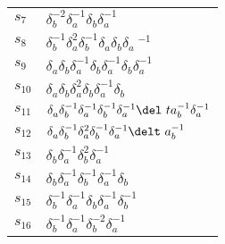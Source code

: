 \documentclass{article}
\begin{document}
\begin{center}
\begin{tabular}{ll}
$s_{7}$ & $\delta_b^{-2}\delta_a^{-1}\delta_b^{}\delta_a^{-1}$ \\
$s_{8}$ & $\delta_b^{-1}\delta_a^{2}\delta_b^{-1}\delta_a^{}\delta_b^{}\delta_a\
^{-1}$ \\
$s_{9}$ & $\delta_a^{}\delta_b^{}\delta_a^{-1}\delta_b^{}\delta_a^{-1}\delta_b^\
{}\delta_a^{-1}$ \\
$s_{10}$ & $\delta_a^{}\delta_b^{}\delta_a^{2}\delta_b^{}\delta_a^{-1}\delta_b^\
{}$ \\
$s_{11}$ & $\delta_a^{}\delta_b^{-1}\delta_a^{-1}\delta_b^{-1}\delta_a^{-1}\del\
ta_b^{-1}\delta_a^{-1}$ \\
$s_{12}$ & $\delta_a^{}\delta_b^{-1}\delta_a^{2}\delta_b^{-1}\delta_a^{-1}\delt\
a_b^{-1}$ \\
$s_{13}$ & $\delta_b^{}\delta_a^{-1}\delta_b^{2}\delta_a^{-1}$ \\
$s_{14}$ & $\delta_b^{}\delta_a^{-1}\delta_b^{-1}\delta_a^{-1}\delta_b^{}$ \\
$s_{15}$ & $\delta_b^{-1}\delta_a^{-1}\delta_b^{}\delta_a^{-1}\delta_b^{-1}$ \\
$s_{16}$ & $\delta_b^{-1}\delta_a^{-1}\delta_b^{-2}\delta_a^{-1}$ \\
\bottomrule
\end{tabular}
\end{center}

\thispagestyle{empty}
\end{document}
